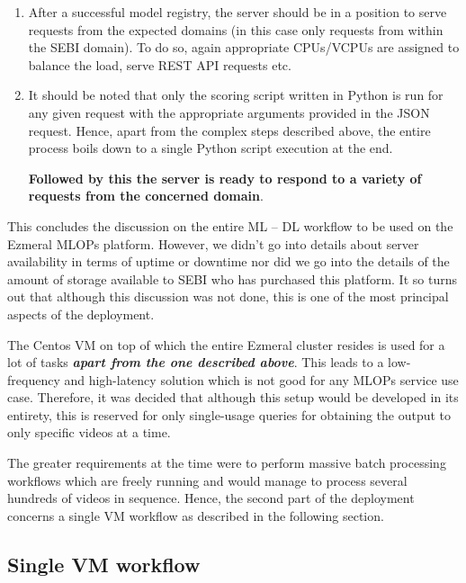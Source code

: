 \begin{enumerate}
  \item  After a successful model registry, the server should be in a
    position to serve requests from the expected domains (in this
    case only requests from within the SEBI domain). To do so, again
    appropriate CPUs/VCPUs are assigned to balance the load, serve
    REST API requests etc.
  \item It should be noted that only the scoring script written in
    Python is run for any given request with the appropriate
    arguments provided in the JSON request. Hence, apart from the
    complex steps described above, the entire process boils down to a
    single Python script execution at the end. \par

    \textbf{Followed by this the server is ready to respond to a
    variety of requests from the concerned domain}.
\end{enumerate}

This concludes the discussion on the entire ML – DL workflow to be
used on the Ezmeral MLOPs platform. However, we didn’t go into
details about server availability in terms of uptime or downtime nor
did we go into the details of the amount of storage available to SEBI
who has purchased this platform. It so turns out that although this
discussion was not done, this is one of the most principal aspects of
the deployment. \par

The Centos VM on top of which the entire Ezmeral cluster resides is
used for a lot of tasks \textbf{\textit{apart from the one described
above}}. This leads to a low-frequency and high-latency solution
which is not good for any MLOPs service use case. Therefore, it was
decided that although this setup would be developed in its entirety,
this is reserved for only single-usage queries for obtaining the
output to only specific videos at a time. \par

The greater requirements at the time were to perform massive batch
processing workflows which are freely running and would manage to
process several hundreds of videos in sequence. Hence, the second
part of the deployment concerns a single VM workflow as described in
the following section.

\subsection{Single VM workflow} \label{vm}

